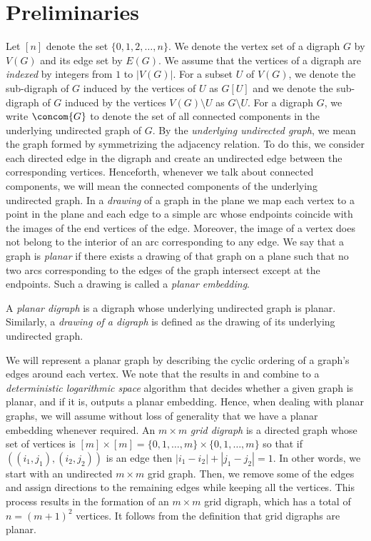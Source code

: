 \documentclass{toc}
\begin{document}
\section{Preliminaries}
\label{sec:prelims}
Let $[n]$ denote the set $\{0,1,2,\ldots , n\}$. %
%
We denote the vertex set of a 
digraph %
$G$ by $V(G)$ and its edge set by $E(G)$. We assume that the vertices of a 
digraph %
are \emph{indexed} by integers from $1$ to $\lvert V(G) \rvert$. For a subset $U$ of $V(G)$, we denote the %
sub-digraph %
 of $G$ induced by the vertices of $U$ as $G[U]$ and we denote the %
sub-digraph %
 of $G$ induced by the vertices $V(G)\setminus U$ as $G\setminus U$. For a 
digraph %
$G$, %
%
we write $\concom{G}$ to denote  %
the set of all connected components
in the underlying undirected graph of $G$.  %
By
the  %
\emph{underlying undirected graph}, we mean the graph formed by %
symmetrizing the adjacency %
relation.  %
To do this, we consider each directed edge in the digraph and create an undirected edge between the corresponding vertices.
%
%
%
%
Henceforth, whenever we talk about connected components, we will mean the connected components of the underlying undirected graph.
%
In a \emph{drawing} of a graph 
in the plane
we map each vertex to
a  %
point %
in  %
the plane and each edge to a simple arc whose endpoints coincide with the
%
images  %
of the end vertices of the edge.
%
%
%
%
%
Moreover, 
%
the image of a vertex does not belong to the interior of an arc corresponding to any edge. %
We say that a graph is \emph{planar} if there exists a drawing of that graph on a plane such that no two
%
arcs corresponding to the edges %
of the graph %
intersect except at the endpoints. %
Such a drawing is called a \emph{planar embedding}.%

A \emph{planar digraph} is a digraph whose underlying undirected graph is planar. Similarly, a \emph{drawing of a digraph} is defined as the drawing of its underlying undirected graph. %

%
We will represent a planar graph by describing the
%
cyclic  %
ordering of a graph's edges around each vertex. %
%
%
%
%
%
We note that %
%
the results in %
\cite{AllenderMahajan} and \cite{Reingold} %
%
combine to %
a \emph{deterministic logarithmic space} algorithm that decides
whether %
a given graph is planar, and if it is, outputs a planar embedding. Hence, when dealing with planar graphs, we will assume without loss of generality that we have a planar embedding whenever required.   %
%
%
%
%
An  %
$m\times m$
%
\emph{grid digraph} %
is a directed graph %
%
whose 
%
set of vertices is %
$[m] \times [m] = \{0,1,\ldots,m\}\times\{0,1,\ldots,m\}$ so that if $((i_1,j_1),(i_2,j_2)) $ is an edge then $|i_1-i_2|+|j_1-j_2|=1$.  
In other words, we start with an undirected $m\times m$ grid graph. Then, we
%
remove some of the edges and assign directions to the remaining edges while keeping all the vertices. This process results in the formation of an $m\times m$ grid digraph, which has a total of $n=(m+1)^2$ vertices. %
 It follows from the definition that grid 
digraphs %
are %
%
planar.  %
%
%
\end{document}
